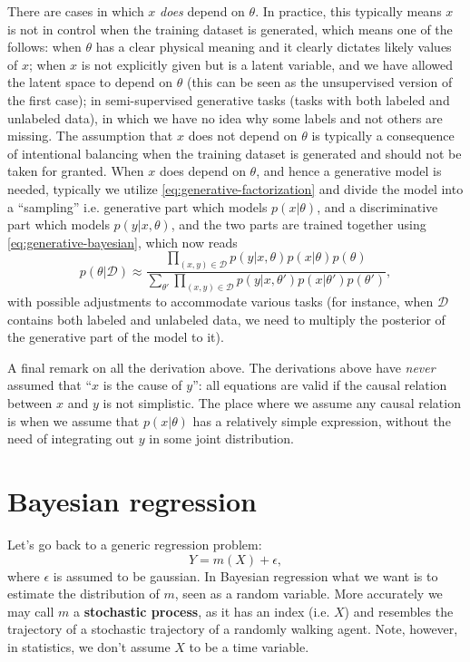 \documentclass[hyperref, a4paper]{article}
\newcommand*{\concept}[1]{{\textbf{#1}}}
\begin{document}
There are cases in which $x$ \emph{does} depend on $\theta$.
In practice, this typically means $x$ is not in control when the training dataset is generated,
which means one of the follows:
when $\theta$ has a clear physical meaning and it clearly dictates likely values of $x$;
when $x$ is not explicitly given but is a latent variable,
and we have allowed the latent space to depend on $\theta$
(this can be seen as the unsupervised version of the first case);
in semi-supervised generative tasks (tasks with both labeled and unlabeled data),
in which we have no idea why some labels and not others are missing.
The assumption that $x$ does not depend on $\theta$ is typically a consequence of intentional balancing when the training dataset is generated and should not be taken for granted.
When $x$ does depend on $\theta$, and hence a generative model is needed,
typically we utilize \eqref{eq:generative-factorization} and divide the model 
into a ``sampling'' i.e. generative part which models $p(x | \theta)$,
and a discriminative part which models $p(y | x, \theta)$,
and the two parts are trained together using \eqref{eq:generative-bayesian},
which now reads 
\begin{equation}
    p(\theta | \mathcal{D}) \approx \frac{
        \prod_{(x, y) \in \mathcal{D}} p(y | x, \theta) p(x | \theta) p(\theta)
    }{
        \sum_{\theta'} \prod_{(x, y) \in \mathcal{D}} p(y | x, \theta') p(x | \theta') p(\theta')
    },
\end{equation}
with possible adjustments to accommodate various tasks
(for instance, when $\mathcal{D}$ contains both labeled and unlabeled data,
we need to multiply the posterior of the generative part of the model to it).

A final remark on all the derivation above.
The derivations above have \emph{never} assumed that ``$x$ is the cause of $y$'':
all equations are valid if the causal relation between $x$ and $y$ is not simplistic.
The place where we assume any causal relation is when we assume that
$p(x | \theta)$ has a relatively simple expression,
without the need of integrating out $y$ in some joint distribution.

\section{Bayesian regression}

Let's go back to a generic regression problem:
\begin{equation}
    Y = m(X) + \epsilon,
\end{equation}
where $\epsilon$ is assumed to be gaussian.
In Bayesian regression what we want is to estimate the distribution of $m$, seen as a random variable.
More accurately we may call $m$ a \concept{stochastic process},
as it has an index (i.e. $X$) and resembles the trajectory of a stochastic trajectory of a randomly walking agent.
Note, however, in statistics,
we don't assume $X$ to be a time variable.
\end{document}

